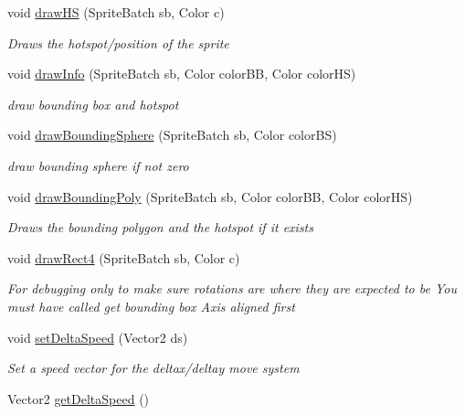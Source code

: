 \begin{DoxyCompactItemize}
void \mbox{\hyperlink{class_r_c___framework_1_1_sprite3_aa82450ed1a30116c7419e79c34c374f4}{draw\+HS}} (Sprite\+Batch sb, Color c)
\begin{DoxyCompactList}\small\item\em Draws the hotspot/position of the sprite \end{DoxyCompactList}\item 
void \mbox{\hyperlink{class_r_c___framework_1_1_sprite3_a1f1acda2345b760c30d0f1c4c0815d4c}{draw\+Info}} (Sprite\+Batch sb, Color color\+BB, Color color\+HS)
\begin{DoxyCompactList}\small\item\em draw bounding box and hotspot \end{DoxyCompactList}\item 
void \mbox{\hyperlink{class_r_c___framework_1_1_sprite3_a33bc86bddbc57f002991ccf17c97d80a}{draw\+Bounding\+Sphere}} (Sprite\+Batch sb, Color color\+BS)
\begin{DoxyCompactList}\small\item\em draw bounding sphere if not zero \end{DoxyCompactList}\item 
void \mbox{\hyperlink{class_r_c___framework_1_1_sprite3_a3787b8d78c1aedee770e6d2871e78156}{draw\+Bounding\+Poly}} (Sprite\+Batch sb, Color color\+BB, Color color\+HS)
\begin{DoxyCompactList}\small\item\em Draws the bounding polygon and the hotspot if it exists \end{DoxyCompactList}\item 
void \mbox{\hyperlink{class_r_c___framework_1_1_sprite3_a0ef49f4248eee1b81e48a2a8125fa477}{draw\+Rect4}} (Sprite\+Batch sb, Color c)
\begin{DoxyCompactList}\small\item\em For debugging only to make sure rotations are where they are expected to be You must have called get bounding box Axis aligned first \end{DoxyCompactList}\item 
void \mbox{\hyperlink{class_r_c___framework_1_1_sprite3_a9a00bb05c798cc43c3518bb5ae6d0186}{set\+Delta\+Speed}} (Vector2 ds)
\begin{DoxyCompactList}\small\item\em Set a speed vector for the deltax/deltay move system \end{DoxyCompactList}\item 
Vector2 \mbox{\hyperlink{class_r_c___framework_1_1_sprite3_a07bcebd23820bced67a5d2a34eeda633}{get\+Delta\+Speed}} ()

\end{DoxyCompactItemize}
